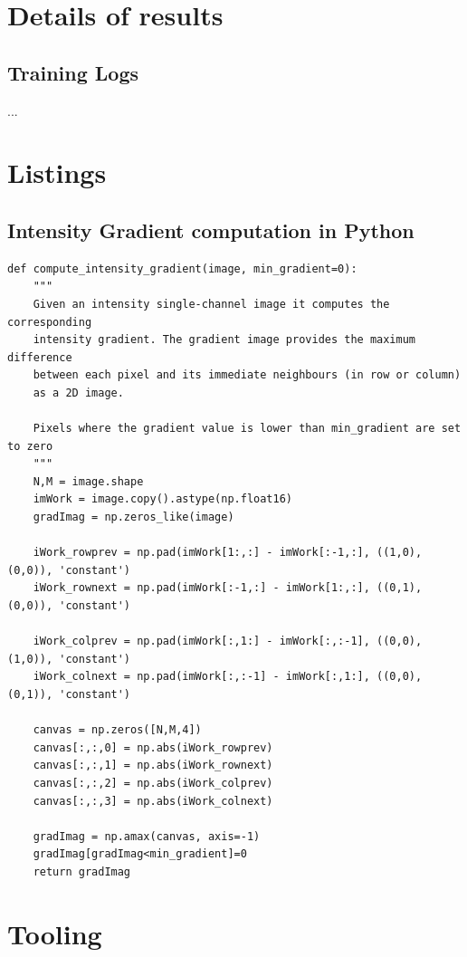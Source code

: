 \documentclass[
  twoside,
  11pt, a4paper,
  footinclude=true,
  headinclude=true,
  cleardoublepage=empty
]{scrbook}
\begin{document}
    \chapter{Details of results} \label{results}
      \section{Training Logs} \label{appendix:training}
        ...

    \chapter{Listings} \label{listings}
      \section{Intensity Gradient computation in Python} \label{appendix:intensity-grad}
        \begin{lstlisting}
def compute_intensity_gradient(image, min_gradient=0):
    """
    Given an intensity single-channel image it computes the corresponding
    intensity gradient. The gradient image provides the maximum difference
    between each pixel and its immediate neighbours (in row or column)
    as a 2D image.

    Pixels where the gradient value is lower than min_gradient are set to zero
    """
    N,M = image.shape
    imWork = image.copy().astype(np.float16)
    gradImag = np.zeros_like(image)

    iWork_rowprev = np.pad(imWork[1:,:] - imWork[:-1,:], ((1,0),(0,0)), 'constant')
    iWork_rownext = np.pad(imWork[:-1,:] - imWork[1:,:], ((0,1),(0,0)), 'constant')

    iWork_colprev = np.pad(imWork[:,1:] - imWork[:,:-1], ((0,0),(1,0)), 'constant')
    iWork_colnext = np.pad(imWork[:,:-1] - imWork[:,1:], ((0,0),(0,1)), 'constant')

    canvas = np.zeros([N,M,4])
    canvas[:,:,0] = np.abs(iWork_rowprev)
    canvas[:,:,1] = np.abs(iWork_rownext)
    canvas[:,:,2] = np.abs(iWork_colprev)
    canvas[:,:,3] = np.abs(iWork_colnext)

    gradImag = np.amax(canvas, axis=-1)
    gradImag[gradImag<min_gradient]=0
    return gradImag
        \end{lstlisting}

    \chapter{Tooling} \label{tooling}
\end{document}
